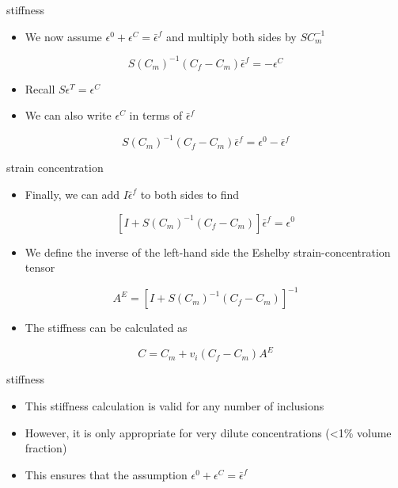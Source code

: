 \documentclass[
  letterpaper,
  ignorenonframetext,
  aspectratio=43,
  handout,
  12pt]{beamer}
\providecommand{\tightlist}{%
  \setlength{\itemsep}{0pt}\setlength{\parskip}{0pt}}
\providecommand{\tightlist}{%
\setlength{\itemsep}{0pt}\setlength{\parskip}{0pt}}
\begin{document}
\begin{frame}{stiffness}
\protect\hypertarget{stiffness-1}{}
\begin{itemize}
\tightlist
\item
  We now assume \(\epsilon^0 + \epsilon^C = \bar{\epsilon}^f\) and
  multiply both sides by \(S C_m^{-1}\)
\end{itemize}

\[S \left( C_m \right ) ^{-1} \left ( C_f - C_m \right ) \bar{\epsilon}^f = -\epsilon^C\]

\begin{itemize}
\tightlist
\item
  Recall \(S\epsilon^T = \epsilon^C\)
\item
  We can also write \(\epsilon^C\) in terms of \(\bar{\epsilon}^f\)
\end{itemize}

\[S \left( C_m \right ) ^{-1} \left ( C_f - C_m \right ) \bar{\epsilon}^f = \epsilon^0- \bar{\epsilon}^f\]
\end{frame}

\begin{frame}{strain concentration}
\protect\hypertarget{strain-concentration}{}
\begin{itemize}
\tightlist
\item
  Finally, we can add \(I\bar{\epsilon}^f\) to both sides to find
\end{itemize}

\[[I+S \left( C_m \right ) ^{-1} \left ( C_f - C_m \right )] \bar{\epsilon}^f = \epsilon^0\]

\begin{itemize}
\tightlist
\item
  We define the inverse of the left-hand side the Eshelby
  strain-concentration tensor
\end{itemize}

\[A^E = [I+S \left( C_m \right ) ^{-1} \left ( C_f - C_m \right )]^{-1}\]

\begin{itemize}
\tightlist
\item
  The stiffness can be calculated as
\end{itemize}

\[C = C_m + v_i (C_f-C_m)A^E\]
\end{frame}

\begin{frame}{stiffness}
\protect\hypertarget{stiffness-2}{}
\begin{itemize}
\tightlist
\item
  This stiffness calculation is valid for any number of inclusions
\item
  However, it is only appropriate for very dilute concentrations
  (\textless1\% volume fraction)
\item
  This ensures that the assumption
  \(\epsilon^0 + \epsilon^C = \bar{\epsilon}^f\)
\end{itemize}
\end{frame}
\end{document}
